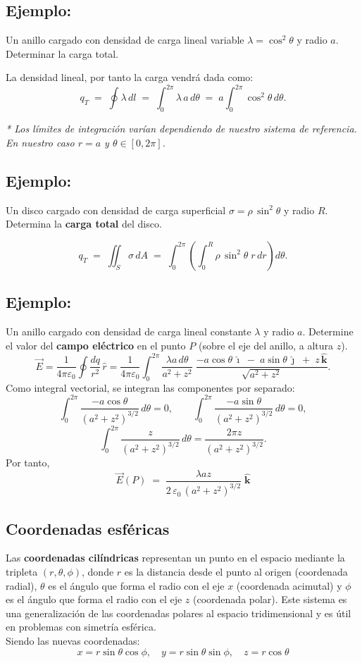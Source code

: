 \documentclass[a4paper,12pt]{article}
\begin{document}
\subsection*{Ejemplo:}
\noindent Un anillo cargado con densidad de carga lineal variable $\lambda=\cos^{2}\theta$ y radio $a$.
Determinar la carga total.

La densidad lineal, por tanto la carga vendrá dada como:
\[
q_T \;=\; \oint \lambda\, dl
 \;=\; \int_{0}^{2\pi} \lambda\, a\, d\theta
 \;=\; a \int_{0}^{2\pi} \cos^{2}\theta\, d\theta .
\]

\textit{* Los límites de integración varían dependiendo de nuestro sistema de referencia.  
En nuestro caso $r=a$ y $\theta\in[0,2\pi]$.}

\bigskip

\subsection*{Ejemplo:}

\noindent
Un disco cargado con densidad de carga superficial $\sigma=\rho\,\sin^{2}\theta$ y radio $R$.  
Determina la \textbf{carga total} del disco.

\[
q_T \;=\; \iint_{S} \sigma\, dA
   \;=\; \int_{0}^{2\pi}\!\left(\int_{0}^{R} \rho\,\sin^{2}\theta \; r\,dr\right)\! d\theta .
\]

\subsection*{Ejemplo:}
\noindent
Un anillo cargado con densidad de carga lineal constante $\lambda$ y radio $a$.  
Determine el valor del \textbf{campo eléctrico} en el punto $P$ (sobre el eje del anillo, a altura $z$).
\[
\vec E
= \frac{1}{4\pi\varepsilon_0}\oint \frac{dq}{r^2}\,\hat r
= \frac{1}{4\pi\varepsilon_0}\int_{0}^{2\pi}
   \frac{\lambda a\, d\theta}{a^{2}+z^{2}}\;
   \frac{-a\cos\theta\,\hat{\imath}\;-\;a\sin\theta\,\hat{\jmath}\;+\;z\,\hat{\mathbf k}}
        {\sqrt{a^{2}+z^{2}}}.
\]
Como integral vectorial, se integran las componentes por separado:
\[
\int_{0}^{2\pi} \frac{-a\cos\theta}{(a^{2}+z^{2})^{3/2}}\, d\theta = 0, \qquad
\int_{0}^{2\pi} \frac{-a\sin\theta}{(a^{2}+z^{2})^{3/2}}\, d\theta = 0,
\]
\[
\int_{0}^{2\pi} \frac{z}{(a^{2}+z^{2})^{3/2}}\, d\theta
= \frac{2\pi z}{(a^{2}+z^{2})^{3/2}}.
\]
Por tanto,
\[
\boxed{\;
\vec E(P) \;=\; \frac{\lambda a z}{2\,\varepsilon_0\,(a^{2}+z^{2})^{3/2}}\;\hat{\mathbf k}
\;}
\]
\subsection{Coordenadas esféricas}
\noindent Las \textbf{coordenadas cilíndricas} representan un punto en el espacio mediante la tripleta
 $(r,\theta,\phi)$, donde $r$ es la distancia desde el punto al origen (coordenada radial),
  $\theta$ es el ángulo que forma el radio con el eje $x$ (coordenada acimutal) y $\phi$ es el
   ángulo que forma el radio con el eje $z$ (coordenada polar). Este sistema es una generalización
    de las coordenadas polares al espacio tridimensional y es útil en problemas con simetría esférica.\\

\noindent Siendo las nuevas coordenadas:
\[
x = r\sin\theta\cos\phi, \quad y = r\sin\theta\sin\phi, \quad z = r\cos\theta
\]
\end{document}
